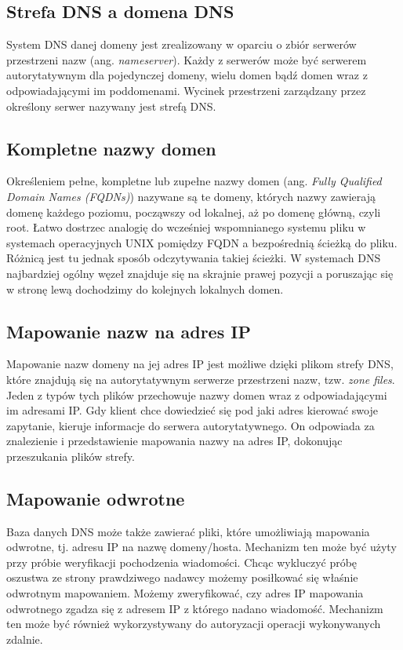 \subsection{Strefa DNS a domena DNS}
System DNS danej domeny jest zrealizowany w oparciu o zbiór serwerów przestrzeni nazw (ang. \textit{nameserver}). Każdy z serwerów
może być serwerem autorytatywnym dla pojedynczej domeny, wielu domen bądź domen wraz z odpowiadającymi im poddomenami. Wycinek
przestrzeni zarządzany przez określony serwer nazywany jest strefą DNS.


\subsection{Kompletne nazwy domen}
\label{sec:FQDN}
Określeniem pełne, kompletne lub zupełne nazwy domen (ang. \textit{Fully Qualified Domain Names (FQDNs)}) nazywane są te domeny,
których nazwy zawierają domenę każdego poziomu, począwszy od lokalnej, aż po domenę główną, czyli root. Łatwo dostrzec analogię
do wcześniej wspomnianego systemu pliku w systemach operacyjnych UNIX pomiędzy FQDN a bezpośrednią ścieżką do pliku. Różnicą jest
tu jednak sposób odczytywania takiej ścieżki. W systemach DNS najbardziej ogólny węzeł znajduje się na skrajnie prawej pozycji a
poruszając się w stronę lewą dochodzimy do kolejnych lokalnych domen.

\subsection{Mapowanie nazw na adres IP}
\label{mapping}
Mapowanie nazw domeny na jej adres IP jest możliwe dzięki plikom strefy DNS, które znajdują się na autorytatywnym serwerze
przestrzeni nazw, tzw. \textit{zone files}. Jeden z typów tych plików przechowuje nazwy domen wraz z odpowiadającymi im adresami
IP. Gdy klient chce dowiedzieć się pod jaki adres kierować swoje zapytanie, kieruje informacje do serwera autorytatywnego. On
odpowiada za znalezienie i przedstawienie mapowania nazwy na adres IP, dokonując przeszukania plików strefy.

\subsection{Mapowanie odwrotne}
\label{revmapping}
Baza danych DNS może także zawierać pliki, które umożliwiają mapowania odwrotne, tj. adresu IP na nazwę domeny/hosta. Mechanizm ten
może być użyty przy próbie weryfikacji pochodzenia wiadomości. Chcąc wykluczyć próbę oszustwa ze strony prawdziwego nadawcy możemy
posiłkować się właśnie odwrotnym mapowaniem. Możemy zweryfikować, czy adres IP mapowania odwrotnego zgadza się z adresem IP z którego
nadano wiadomość. Mechanizm ten może być również wykorzystywany do autoryzacji operacji wykonywanych zdalnie.

